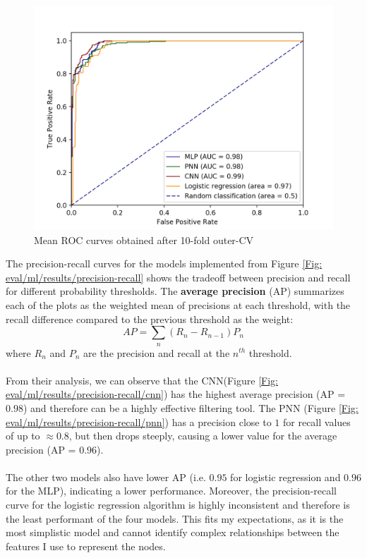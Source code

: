 		\begin{figure}[H]
			\centering
			\includegraphics[width=\textwidth]{graphics/ROC-curve}
			\caption{Mean ROC curves obtained after 10-fold outer-CV}
			\label{Fig: eval/ml/results/ROC}
		\end{figure}
		The precision-recall curves for the models implemented from Figure \ref{Fig: eval/ml/results/precision-recall} shows the tradeoff between precision and recall for different probability thresholds. The \textbf{average precision} (AP) summarizes each of the plots as the weighted mean of precisions at each threshold, with the recall difference compared to the previous threshold as the weight:
		\begin{equation}
			AP = \sum_{n} (R_n - R_{n-1}) P_n
		\end{equation}
		where $R_n$ and $P_n$ are the precision and recall at the $n^{th}$ threshold. 
		\\ \\
		From their analysis, we can observe that the CNN(Figure \ref{Fig: eval/ml/results/precision-recall/cnn}) has the highest average precision (AP = $0.98$) and therefore can be a highly effective filtering tool. The PNN (Figure \ref{Fig: eval/ml/results/precision-recall/pnn}) has a precision close to $1$ for recall values of up to $\approx 0.8$, but then drops steeply, causing a lower value for the average precision (AP = $0.96$). 
		\\ \\
		The other two models also have lower AP (i.e. $0.95$ for logistic regression and $0.96$ for the MLP), indicating a lower performance. Moreover, the precision-recall curve for the logistic regression algorithm is highly inconsistent and therefore is the least performant of the four models. This fits my expectations, as it is the most simplistic model and cannot identify complex relationships between the features I use to represent the nodes.
